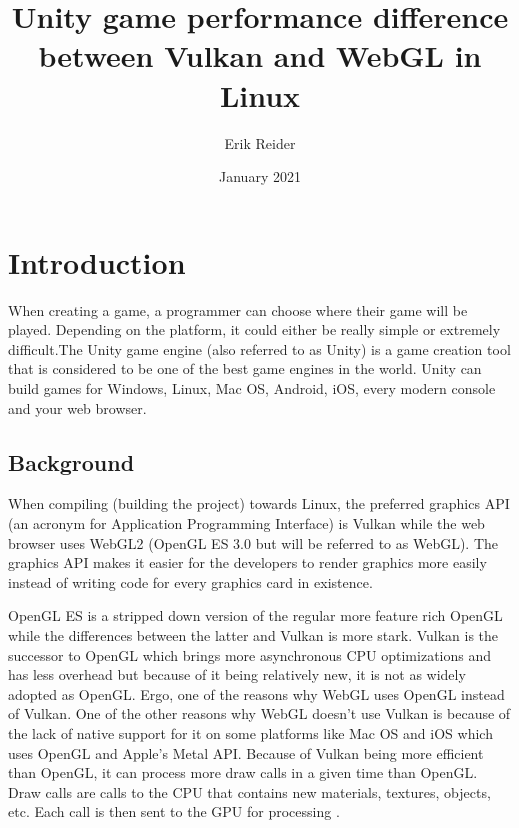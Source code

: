 \documentclass{article}
\title{Unity game performance difference between Vulkan and WebGL in Linux}
\author{Erik Reider}
\date{January 2021}
\begin{document}
\maketitle
\newpage

\begin{abstract}

\end{abstract}


\newpage
\frontmatter
\tableofcontents
\newpage


\section {Introduction}
When creating a game, a programmer can choose where their game will be played. Depending on the platform, it could either be really simple or extremely difficult.The Unity game engine (also referred to as Unity) is a game creation tool that is considered to be one of the best game engines in the world. Unity can build games for Windows, Linux, Mac OS, Android, iOS, every modern console and your web browser.

\subsection {Background}
When compiling (building the project) towards Linux, the preferred graphics API (an acronym for Application Programming Interface) is Vulkan while the web browser uses WebGL2 (OpenGL ES 3.0 but will be referred to as WebGL). The graphics API makes it easier for the developers to render graphics more easily instead of writing code for every graphics card in existence\cite{APIWiki}. \par

OpenGL ES is a stripped down version of the regular more feature rich OpenGL while the differences between the latter and Vulkan is more stark. Vulkan is the successor to OpenGL which brings more asynchronous CPU optimizations and has less overhead but because of it being relatively new, it is not as widely adopted as OpenGL. Ergo, one of the reasons why WebGL uses OpenGL instead of Vulkan. One of the other reasons why WebGL doesn’t use Vulkan is because of the lack of native support for it on some platforms like Mac OS and iOS which uses OpenGL and Apple’s Metal API. Because of Vulkan being more efficient than OpenGL, it can process more draw calls in a given time than OpenGL. Draw calls are calls to the CPU that contains new materials, textures, objects, etc. Each call is then sent to the GPU for processing \cite{DrawCalls}. \par
\end{document}
